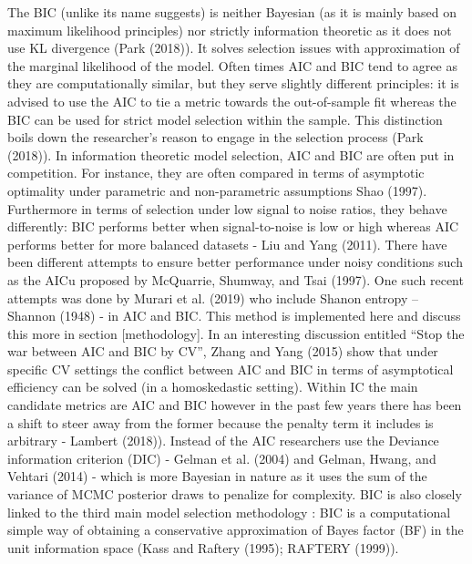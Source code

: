 \documentclass[]{article}
\begin{document}
The BIC (unlike its name suggests) is neither Bayesian (as it is mainly
based on maximum likelihood principles) nor strictly information
theoretic as it does not use KL divergence (Park (2018)). It solves
selection issues with approximation of the marginal likelihood of the
model. Often times AIC and BIC tend to agree as they are computationally
similar, but they serve slightly different principles: it is advised to
use the AIC to tie a metric towards the out-of-sample fit whereas the
BIC can be used for strict model selection within the sample. This
distinction boils down the researcher's reason to engage in the
selection process (Park (2018)). In information theoretic model
selection, AIC and BIC are often put in competition. For instance, they
are often compared in terms of asymptotic optimality under parametric
and non-parametric assumptions Shao (1997). Furthermore in terms of
selection under low signal to noise ratios, they behave differently: BIC
performs better when signal-to-noise is low or high whereas AIC performs
better for more balanced datasets - Liu and Yang (2011). There have been
different attempts to ensure better performance under noisy conditions
such as the AICu proposed by McQuarrie, Shumway, and Tsai (1997). One
such recent attempts was done by Murari et al. (2019) who include Shanon
entropy -- Shannon (1948) - in AIC and BIC. This method is implemented
here and discuss this more in section {[}methodology{]}. In an
interesting discussion entitled ``Stop the war between AIC and BIC by
CV'', Zhang and Yang (2015) show that under specific CV settings the
conflict between AIC and BIC in terms of asymptotical efficiency can be
solved (in a homoskedastic setting). Within IC the main candidate
metrics are AIC and BIC however in the past few years there has been a
shift to steer away from the former because the penalty term it includes
is arbitrary - Lambert (2018)). Instead of the AIC researchers use the
Deviance information criterion (DIC) - Gelman et al. (2004) and Gelman,
Hwang, and Vehtari (2014) - which is more Bayesian in nature as it uses
the sum of the variance of MCMC posterior draws to penalize for
complexity. BIC is also closely linked to the third main model selection
methodology : BIC is a computational simple way of obtaining a
conservative approximation of Bayes factor (BF) in the unit information
space (Kass and Raftery (1995); RAFTERY (1999)).
\end{document}
